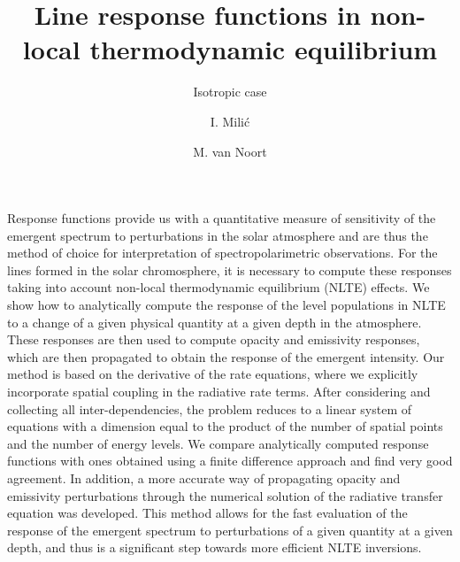 \documentclass{aa}
\begin{document}
   \title{Line response functions in non-local thermodynamic equilibrium}

   \subtitle{Isotropic case}

   \author{I. Mili\'{c}
   \and
   M. van Noort}
   

   \date{}


  \abstract
   {Response functions provide us with a quantitative measure of sensitivity of the emergent spectrum to perturbations in the solar atmosphere and are thus the method of choice for interpretation of spectropolarimetric observations. For the lines formed in the solar chromosphere, it is necessary to compute these responses taking into account non-local thermodynamic equilibrium (NLTE) effects.}  
  {We show how to analytically compute the response of the level populations in NLTE to a change of a given physical quantity at a given depth in the atmosphere. These responses are then used to compute opacity and emissivity responses, which are then propagated to obtain the response of the emergent intensity.}
   {Our method is based on the derivative of the rate equations, where we explicitly incorporate spatial coupling in the radiative rate terms. After considering and collecting all inter-dependencies, the problem reduces to a linear system of equations with a dimension equal to the product of the number of spatial points and the number of energy levels.}
   {We compare analytically computed response functions with ones obtained using a finite difference approach and find very good agreement. In addition, a more accurate way of propagating opacity and emissivity perturbations through the numerical solution of the radiative transfer equation was developed.} 
   {This method allows for the fast evaluation of the response of the emergent spectrum to perturbations of a given quantity at a given depth, and thus is a significant step towards more efficient NLTE inversions.}
 
\end{document}
